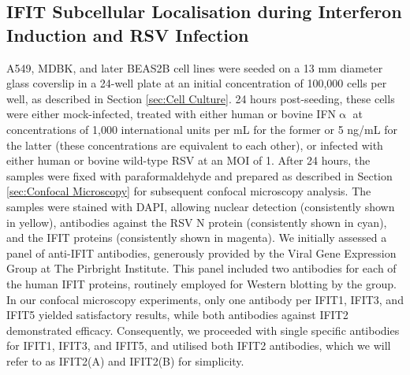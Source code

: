\subsection{IFIT Subcellular Localisation during Interferon Induction and RSV Infection} \label{subsec:IFIT Subcellular Localisation During Interferon Induction and RSV Infection}
A549, MDBK, and later BEAS2B cell lines were seeded on a 13 mm diameter glass coverslip in a 24-well plate at an initial concentration of 100,000 cells per well, as described in Section \ref{sec:Cell Culture}. 24 hours post-seeding, these cells were either mock-infected, treated with either human or bovine IFN$\upalpha$ at concentrations of 1,000 international units per mL for the former or 5 ng/mL for the latter (these concentrations are equivalent to each other), or infected with either human or bovine wild-type RSV at an MOI of 1. After 24 hours, the samples were fixed with paraformaldehyde and prepared as described in Section \ref{sec:Confocal Microscopy} for subsequent confocal microscopy analysis. The samples were stained with DAPI, allowing nuclear detection (consistently shown in yellow), antibodies against the RSV N protein (consistently shown in cyan), and the IFIT proteins (consistently shown in magenta). We initially assessed a panel of anti-IFIT antibodies, generously provided by the Viral Gene Expression Group at The Pirbright Institute. This panel included two antibodies for each of the human IFIT proteins, routinely employed for Western blotting by the group. In our confocal microscopy experiments, only one antibody per IFIT1, IFIT3, and IFIT5 yielded satisfactory results, while both antibodies against IFIT2 demonstrated efficacy. Consequently, we proceeded with single specific antibodies for IFIT1, IFIT3, and IFIT5, and utilised both IFIT2 antibodies, which we will refer to as IFIT2(A) and IFIT2(B) for simplicity.

